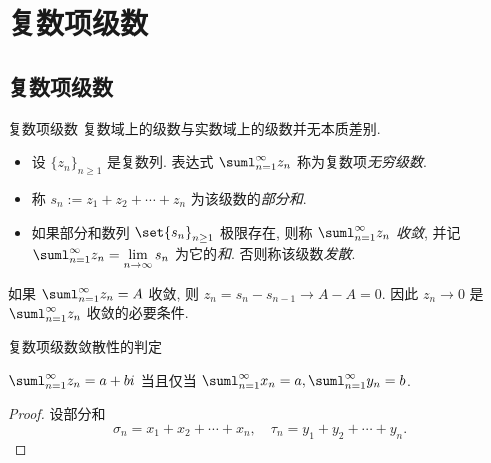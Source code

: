 \section{复数项级数}

\subsection{复数项级数}
\begin{frame}{复数项级数}
	\onslide<+->
	复数域上的级数与实数域上的级数并无本质差别.

	\onslide<+->
	\begin{definition}
		\begin{itemize}
			\item 设 $\{z_n\}_{n\ge1}$ 是复数列. 表达式 $\suml_{n=1}^\infty z_n$ 称为复数项\emph{无穷级数}.
			\item 称 $s_n:=z_1+z_2+\cdots+z_n$ 为该级数的\emph{部分和}.
			\item 如果部分和数列 $\set{s_n}_{n\ge 1}$ 极限存在, 则称 $\suml_{n=1}^\infty z_n$ \emph{收敛}, 并记 $\suml_{n=1}^\infty z_n=\lim\limits_{n\to\infty}s_n$ 为它的\emph{和}. 否则称该级数\emph{发散}.
		\end{itemize}
	\end{definition}

	\onslide<+->
	如果 $\suml_{n=1}^\infty z_n=A$ 收敛, 则 $z_n=s_n-s_{n-1}\to A-A=0$.
	\onslide<+->
	因此 \alert{$z_n\to0$ 是 $\suml_{n=1}^\infty z_n$ 收敛的必要条件}.
\end{frame}


\begin{frame}{复数项级数敛散性的判定}
	\onslide<+->
	\begin{theorem}
		$\suml_{n=1}^\infty z_n=a+bi$ 当且仅当 $\suml_{n=1}^\infty x_n=a,\suml_{n=1}^\infty y_n=b$.
	\end{theorem}

	\onslide<+->
	\begin{proof}
		设部分和
	\[
		\sigma_n=x_1+x_2+\cdots+x_n,\quad
			\tau_n=y_1+y_2+\cdots+y_n.
	\]
		\onslide<+->{于是命题得证.\qedhere}
	\end{proof}
\end{frame}


